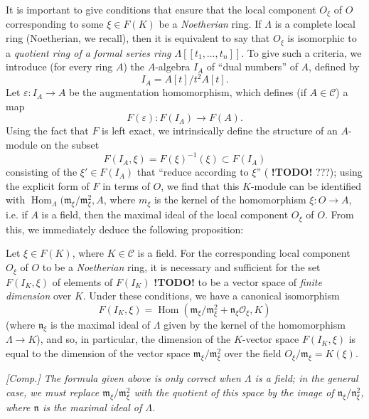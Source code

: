 \documentclass{article}
\theoremstyle{plain}
\newenvironment{proposition}[1]
  {\renewcommand\theinnercustomproposition{#1}\innercustomproposition}
  {\endinnercustomproposition}
\theoremstyle{definition}
\newcommand{\sh}[1]{{\mathscr{#1}}}
\newcommand{\cat}[1]{{\mathcal{#1}}}
\newcommand{\fk}[1]{{\mathfrak{#1}}}
\DeclareMathOperator{\Hom}{Hom}
\newcommand{\todo}{\textbf{ !TODO! }}
\newcommand{\oldpage}[1]{\marginpar{\footnotesize$\Big\vert$ \textit{p.~#1}}}
\begin{document}
It is important to give conditions that ensure that the local component $O_\xi$ of $O$ corresponding to some $\xi\in F(K)$ be a \emph{Noetherian} ring.
If $\Lambda$ is a complete local ring (Noetherian, we recall), then it is equivalent to say that $O_\xi$ is isomorphic to a \emph{quotient ring of a formal series ring $\Lambda[[t_1,\ldots,t_n]]$}.
To give such a criteria, we introduce (for every ring $A$) the $A$-algebra $I_A$ of ``dual numbers'' of $A$, defined by
\[
  I_A = A[t]/t^2A[t].
\]
Let $\varepsilon\colon I_A\to A$ be the augmentation homomorphism, which defines (if $A\in\cat{C}$) a map
\[
  F(\varepsilon)\colon F(I_A) \to F(A).
\]
\oldpage{195-08}
Using the fact that $F$ is left exact, we intrinsically define the structure of an $A$-module on the subset
\[
  F(I_A,\xi) = F(\xi)^{-1}(\xi) \subset F(I_A)
\]
consisting of the $\xi'\in F(I_A)$ that ``reduce according to $\xi$'' (\todo???);
using the explicit form of $F$ in terms of $O$, we find that this $K$-module can be identified with $\Hom_\Lambda(\fk{m}_\xi/\fk{m}_\xi^2,A$, where $m_\xi$ is the kernel of the homomorphism $\xi\colon O\to A$, i.e. if $A$ is a field, then the maximal ideal of the local component $O_\xi$ of $O$.
From this, we immediately deduce the following proposition:

\begin{proposition}{5.1}
\label{A.5-proposition1}
  Let $\xi\in F(K)$, where $K\in\cat{C}$ is a field.
  For the corresponding local component $O_\xi$ of $O$ to be a \emph{Noetherian} ring, it is necessary and sufficient for the set $F(I_K,\xi)$ of elements of $F(I_K)$ \todo to be a vector space of \emph{finite dimension} over $K$.
  Under these conditions, we have a canonical isomorphism
  \[
    F(I_K,\xi) = \Hom(\fk{m}_\xi/\fk{m}_\xi^2+\fk{n}_\xi\sh{O}_\xi, K)
  \]
  (where $\fk{n}_\xi$ is the maximal ideal of $\Lambda$ given by the kernel of the homomorphism $\Lambda\to K$), and so, in particular, the dimension of the $K$-vector space $F(I_K,\xi)$ is equal to the dimension of the vector space $\fk{m}_\xi/\fk{m}_\xi^2$ over the field $O_\xi/\fk{m}_\xi=K(\xi)$.

  \emph{[Comp.] The formula given above is only correct when $\Lambda$ is a field; in the general case, we must replace $\fk{m}_\xi/\fk{m}_\xi^2$ with the quotient of this space by the image of $\fk{n}_\xi/\fk{n}_\xi^2$, where $\fk{n}$ is the maximal ideal of $\Lambda$.}
\end{proposition}
\end{document}
